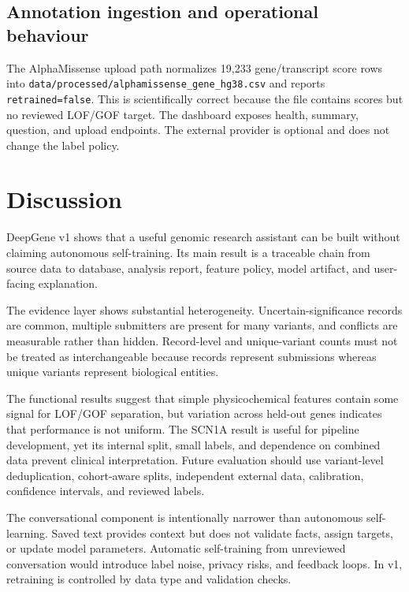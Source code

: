 \documentclass[12pt,a4paper]{article}
\newcommand{\code}[1]{\nolinkurl{#1}}
\begin{document}
\subsection{Annotation ingestion and operational behaviour}
The AlphaMissense upload path normalizes 19,233 gene/transcript score rows into \code{data/processed/alphamissense\_gene\_hg38.csv} and reports \code{retrained=false}. This is scientifically correct because the file contains scores but no reviewed LOF/GOF target. The dashboard exposes health, summary, question, and upload endpoints. The external provider is optional and does not change the label policy.

\section{Discussion}
DeepGene v1 shows that a useful genomic research assistant can be built without claiming autonomous self-training. Its main result is a traceable chain from source data to database, analysis report, feature policy, model artifact, and user-facing explanation.

The evidence layer shows substantial heterogeneity. Uncertain-significance records are common, multiple submitters are present for many variants, and conflicts are measurable rather than hidden. Record-level and unique-variant counts must not be treated as interchangeable because records represent submissions whereas unique variants represent biological entities.

The functional results suggest that simple physicochemical features contain some signal for LOF/GOF separation, but variation across held-out genes indicates that performance is not uniform. The SCN1A result is useful for pipeline development, yet its internal split, small labels, and dependence on combined data prevent clinical interpretation. Future evaluation should use variant-level deduplication, cohort-aware splits, independent external data, calibration, confidence intervals, and reviewed labels.

The conversational component is intentionally narrower than autonomous self-learning. Saved text provides context but does not validate facts, assign targets, or update model parameters. Automatic self-training from unreviewed conversation would introduce label noise, privacy risks, and feedback loops. In v1, retraining is controlled by data type and validation checks.
\end{document}
